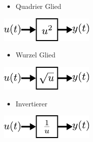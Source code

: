\begin{figure}[h]
	\vspace{1cm}
	\begin{subfigure}[c]{\textwidth}
		\begin{minipage}{0.5\textwidth}
			\begin{itemize}
				\item Quadrier Glied
			\end{itemize}
		\end{minipage}\hfill
		\begin{minipage}{0.5\textwidth}
			\centering
			\includegraphics[width=0.5\textwidth]{Abbildungen/Modellbildung/PDF/Quadrierer.pdf}
		\end{minipage}
	\end{subfigure} 
	\vspace{1cm}
	\begin{subfigure}[c]{\textwidth}
		\begin{minipage}{0.5\textwidth}
			\begin{itemize}
				\item Wurzel Glied
			\end{itemize}
		\end{minipage}\hfill
		\begin{minipage}{0.5\textwidth}
			\centering
			\includegraphics[width=0.5\textwidth]{Abbildungen/Modellbildung/PDF/Ratifizierer.pdf}
		\end{minipage}
	\end{subfigure} 
	\vspace{1cm}
	\begin{subfigure}[c]{\textwidth}
		\begin{minipage}{0.5\textwidth}
			\begin{itemize}
				\item Invertierer
			\end{itemize}
		\end{minipage}\hfill
		\begin{minipage}{0.5\textwidth}
			\centering
			\includegraphics[width=0.5\textwidth]{Abbildungen/Modellbildung/PDF/Invertierer.pdf}
		\end{minipage}
	\end{subfigure}
\end{figure}\\\\

